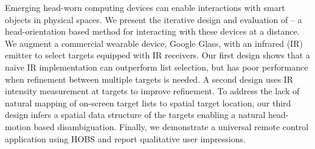 
Emerging head-worn computing devices can enable interactions with smart objects in physical spaces. 
%
We present the iterative design and evaluation of \systemname -- a head-orientation based method for interacting with these devices at a distance. We augment a commercial wearable device, Google Glass, with an infrared (IR) emitter to select targets equipped with IR receivers. Our first design shows that a naive IR implementation can outperform list selection, but has poor performance when refinement between multiple targets is needed. A second design uses IR intensity measurement at targets to improve refinement. To address the lack of natural mapping of on-screen target lists to spatial target location, our third design infers a spatial data structure of the targets enabling a natural head-motion based disambiguation.
%
Finally, we demonstrate a universal remote control application using HOBS and report qualitative user impressions.
